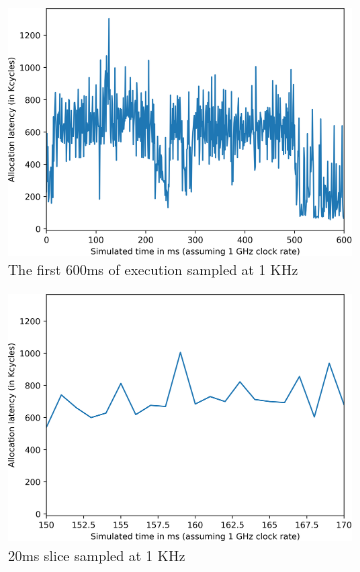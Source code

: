 
\begin{figure}
	\centering
	\begin{subfigure}[t]{0.33\textwidth}
		\includegraphics[width=\textwidth]{results/java-alloc-macro.png}
		\caption{The first 600ms of execution sampled at 1 KHz}
	\end{subfigure}
	\begin{subfigure}[t]{0.33\textwidth}
		\includegraphics[width=\textwidth]{results/java-alloc-1khz.png}
		\caption{20ms slice sampled at 1 KHz}
	\end{subfigure}
	\begin{subfigure}[t]{0.33\textwidth}

\end{subfigure}
\end{figure}
